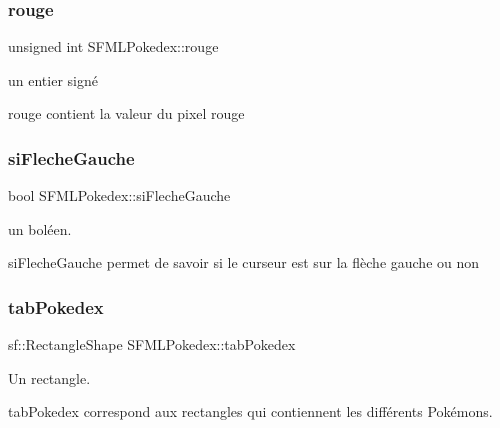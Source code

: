 \subsubsection{\texorpdfstring{rouge}{rouge}}
{\footnotesize\ttfamily unsigned int S\+F\+M\+L\+Pokedex\+::rouge\hspace{0.3cm}{\ttfamily [private]}}



un entier signé 

rouge contient la valeur du pixel rouge \mbox{\label{class_s_f_m_l_pokedex_a8c16438639f1b205188fbd00f04791bf}} 
\subsubsection{\texorpdfstring{si\+Fleche\+Gauche}{siFlecheGauche}}
{\footnotesize\ttfamily bool S\+F\+M\+L\+Pokedex\+::si\+Fleche\+Gauche\hspace{0.3cm}{\ttfamily [private]}}



un boléen. 

si\+Fleche\+Gauche permet de savoir si le curseur est sur la flèche gauche ou non \mbox{\label{class_s_f_m_l_pokedex_aeb5376123a919717951f1d8a68fae12f}} 
\subsubsection{\texorpdfstring{tab\+Pokedex}{tabPokedex}}
{\footnotesize\ttfamily sf\+::\+Rectangle\+Shape S\+F\+M\+L\+Pokedex\+::tab\+Pokedex\hspace{0.3cm}{\ttfamily [private]}}



Un rectangle. 

tab\+Pokedex correspond aux rectangles qui contiennent les différents Pokémons. \mbox{\label{class_s_f_m_l_pokedex_a4ef635a4200985034d8b0f8c1cc200b8}} 
